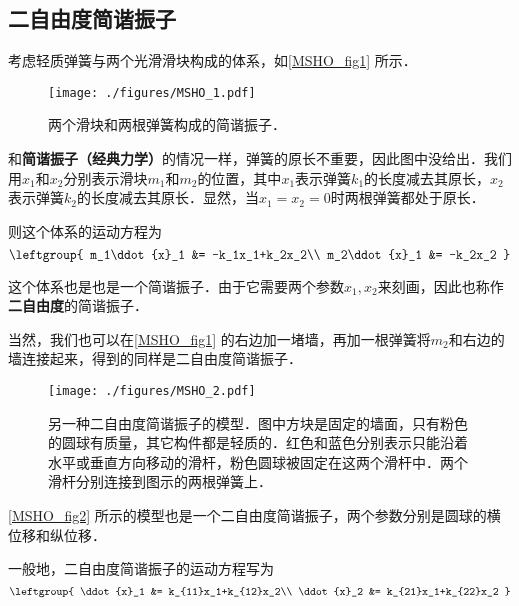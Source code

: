 

\subsection{二自由度简谐振子}

考虑轻质弹簧与两个光滑滑块构成的体系，如\autoref{MSHO_fig1} 所示．

\begin{figure}[ht]
\centering
\texttt{[image: ./figures/MSHO\_1.pdf]}
\caption{两个滑块和两根弹簧构成的简谐振子．} \label{MSHO_fig1}
\end{figure}

和\textbf{简谐振子（经典力学）}的情况一样，弹簧的原长不重要，因此图中没给出．我们用$x_1$和$x_2$分别表示滑块$m_1$和$m_2$的位置，其中$x_1$表示弹簧$k_1$的长度减去其原长，$x_2$表示弹簧$k_2$的长度减去其原长．显然，当$x_1=x_2=0$时两根弹簧都处于原长．

则这个体系的运动方程为
\begin{equation}
\leftgroup{
    m_1\ddot{x}_1 &= -k_1x_1+k_2x_2\\
    m_2\ddot{x}_1 &= -k_2x_2
}
\end{equation}

这个体系也是也是一个简谐振子．由于它需要两个参数$x_1, x_2$来刻画，因此也称作\textbf{二自由度}的简谐振子．

当然，我们也可以在\autoref{MSHO_fig1} 的右边加一堵墙，再加一根弹簧将$m_2$和右边的墙连接起来，得到的同样是二自由度简谐振子．


\begin{figure}[ht]
\centering
\texttt{[image: ./figures/MSHO\_2.pdf]}
\caption{另一种二自由度简谐振子的模型．图中方块是固定的墙面，只有粉色的圆球有质量，其它构件都是轻质的．红色和蓝色分别表示只能沿着水平或垂直方向移动的滑杆，粉色圆球被固定在这两个滑杆中．两个滑杆分别连接到图示的两根弹簧上．} \label{MSHO_fig2}
\end{figure}

\autoref{MSHO_fig2} 所示的模型也是一个二自由度简谐振子，两个参数分别是圆球的横位移和纵位移．

一般地，二自由度简谐振子的运动方程写为
\begin{equation}\label{MSHO_eq1}
\leftgroup{
    \ddot{x}_1 &= k_{11}x_1+k_{12}x_2\\
    \ddot{x}_2 &= k_{21}x_1+k_{22}x_2
}
\end{equation}


